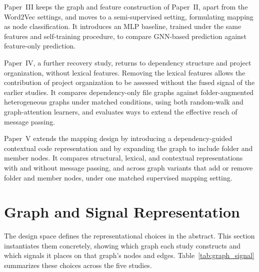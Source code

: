 Paper~III keeps the graph and feature construction of Paper~II, apart from the Word2Vec settings, and moves to a semi-supervised setting, formulating mapping as node classification. It introduces an MLP baseline, trained under the same features and self-training procedure, to compare GNN-based prediction against feature-only prediction.

Paper~IV, a further recovery study, returns to dependency structure and project organization, without lexical features. Removing the lexical features allows the contribution of project organization to be assessed without the fused signal of the earlier studies. It compares dependency-only file graphs against folder-augmented heterogeneous graphs under matched conditions, using both random-walk and graph-attention learners, and evaluates ways to extend the effective reach of message passing.
 
Paper~V extends the mapping design by introducing a dependency-guided contextual code representation and by expanding the graph to include folder and member nodes. It compares structural, lexical, and contextual representations with and without message passing, and across graph variants that add or remove folder and member nodes, under one matched supervised mapping setting.

\section{Graph and Signal Representation}
\label{sec:graph_signal_representation}

The design space defines the representational choices in the abstract. This section instantiates them concretely, showing which graph each study constructs and which signals it places on that graph's nodes and edges. Table~\ref{tab:graph_signal} summarizes these choices across the five studies.
 
